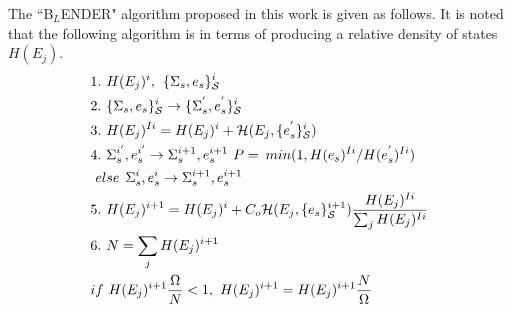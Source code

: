 \documentclass[aps,prl,reprint,superscriptaddress,showkeys]{revtex4-1}
\begin{document}
The ``B$_{L}$ENDER" algorithm proposed in this work  is given as follows. It is noted that the following algorithm is in terms of producing a relative density of states $H(E_j)$.  \\
\begin{equation}
\begin{split}
&1.\hspace{0.125cm} H(E_j)^i ,\hspace{0.15cm}  \{\Sigma_{s},e_s\}_{\mathcal{S}}^i\\
&2. \hspace{0.125cm}\{\Sigma_{s},e_s\}_{\mathcal{S}}^i \rightarrow  \{\Sigma_{s}^{'},e_s^{'}\}_{\mathcal{S}}^i\\
&3. \hspace{0.125cm}H(E_j)^{Ii} = H(E_j)^i + \mathcal{H}(E_j, \{e_{s}^{'}\}_{\mathcal{S}}^i) \\
&4. \hspace{0.125cm} \Sigma_{s}^{i'}, e_s^{i'} \rightarrow \Sigma_{s}^{i+1},e_s^{i+1}   \hspace{0.125cm} P = \hspace{0.075cm} min (1, H(e_s)^{Ii}/H(e_s^{'})^{Ii})\\
& \hspace{0.125cm}else  \hspace{0.15cm} \Sigma_{s}^i, e_s^i \rightarrow \Sigma_{s}^{i+1}, e_s^{i+1}\\
&5. \hspace{0.125cm} H(E_j)^{i+1} = H(E_j)^{i} + C_o\mathcal{H}(E_j, \{e_s\}_{\mathcal{S}}^{i+1})\frac{H(E_j)^{Ii}}{\sum_j H(E_j)^{Ii} }\\
&6. \hspace{0.125cm} N = \sum_j H(E_j)^{i+1} \hspace{0.125cm}\\
& if \hspace{0.125cm} H(E_j)^{i+1}\frac{\Omega}{N}  < 1, \hspace{0.125cm}  H(E_j)^{i+1} = H(E_j)^{i+1} \frac{N}{\Omega}
\end{split}
\end{equation}
\end{document}
